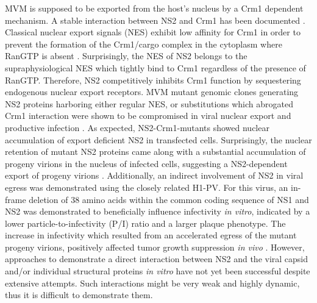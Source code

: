 MVM is supposed to be exported from the host’s nucleus by a Crm1 dependent mechanism. A stable interaction between NS2 and Crm1 has been documented \cite{pmid10438867, pmid10527855}. Classical nuclear export signals (NES) exhibit low affinity for Crm1 in order to prevent the formation of the Crm1/cargo complex in the cytoplasm where RanGTP is absent \cite{pmid10449743}. Surprisingly, the NES of NS2 belongs to the supraphysiological NES which tightly bind to Crm1 regardless of the presence of RanGTP. Therefore, NS2 competitively inhibits Crm1 function by sequestering endogenous nuclear export receptors. MVM mutant genomic clones generating NS2 proteins harboring either regular NES, or substitutions which abrogated Crm1 interaction were shown to be compromised in viral nuclear export and productive infection \cite{pmid18385513}. As expected, NS2-Crm1-mutants showed nuclear accumulation of export deficient NS2 in transfected cells. Surprisingly, the nuclear retention of mutant NS2 proteins came along with a substantial accumulation of progeny virions in the nucleus of infected cells, suggesting a NS2-dependent export of progeny virions \cite{pmid12239307}. Additionally, an indirect involvement of NS2 in viral egress was demonstrated using the closely related H1-PV. For this virus, an in-frame deletion of 38 amino acids within the common coding sequence of NS1 and NS2 was demonstrated to beneficially influence infectivity \textit{in vitro}, indicated by a lower particle-to-infectivity (P/I) ratio and a larger plaque phenotype. The increase in infectivity which resulted from an accelerated egress of the mutant progeny virions, positively affected tumor growth suppression \textit{in vivo} \cite{pmid22553326}. However, approaches to demonstrate a direct interaction between NS2 and the viral capsid and/or individual structural proteins \textit{in vitro} have not yet been successful despite extensive attempts. Such interactions might be very weak and highly dynamic, thus it is difficult to demonstrate them.  


